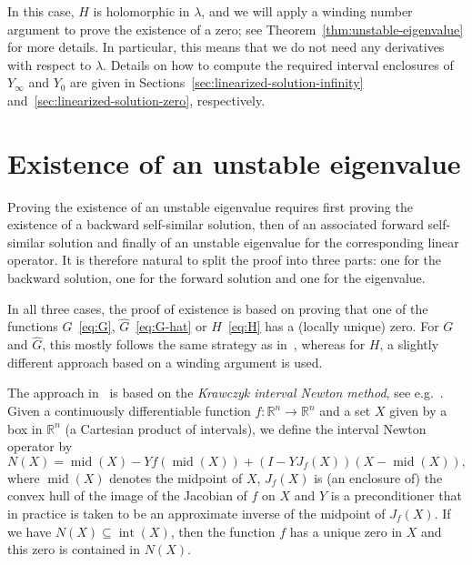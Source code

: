 \documentclass[11pt]{article}
\begin{document}
In this case, \(H\) is holomorphic in \(\lambda\), and we will
apply a winding number argument to prove the existence of a zero; see
Theorem~\ref{thm:unstable-eigenvalue} for more details. In particular,
this means that we do not need any derivatives with respect to
\(\lambda\). Details on how to compute the required interval
enclosures of \(Y_{\infty}\) and \(Y_{0}\) are given in
Sections~\ref{sec:linearized-solution-infinity}
and~\ref{sec:linearized-solution-zero}, respectively.

\section{Existence of an unstable eigenvalue}
\label{sec:existence-unstable-eigenvalue}

Proving the existence of an unstable eigenvalue requires first proving
the existence of a backward self-similar solution, then of an
associated forward self-similar solution and finally of an unstable
eigenvalue for the corresponding linear operator. It is therefore
natural to split the proof into three parts: one for the backward
solution, one for the forward solution and one for the eigenvalue.

In all three cases, the proof of existence is based on proving that
one of the functions \(G\)~\eqref{eq:G}, \(\hat{G}\)~\eqref{eq:G-hat}
or \(H\)~\eqref{eq:H} has a (locally unique) zero. For \(G\) and
\(\hat{G}\), this mostly follows the same strategy as
in~\cite[Section~5.1]{Dahne2024}, whereas for \(H\), a slightly
different approach based on a winding argument is used.

The approach in~\cite{Dahne2024} is based on the \emph{Krawczyk
  interval Newton method}, see e.g.~\cite{Moore1977}. Given a
continuously differentiable function
\(f\colon\mathbb{R}^{n} \to \mathbb{R}^{n}\) and a set \(X\) given by
a box in \(\mathbb{R}^{n}\) (a Cartesian product of intervals), we
define the interval Newton operator by
\begin{equation*}
  N(X) = \operatorname{mid}(X) - Yf(\operatorname{mid}(X)) + (I - YJ_{f}(X))(X - \operatorname{mid}(X)),
\end{equation*}
where \(\operatorname{mid}(X)\) denotes the midpoint of \(X\),
\(J_{f}(X)\) is (an enclosure of) the convex hull of the image of the
Jacobian of \(f\) on \(X\) and \(Y\) is a preconditioner that in
practice is taken to be an approximate inverse of the midpoint of
\(J_{f}(X)\). If we have \(N(X) \subseteq \operatorname{int}(X)\),
then the function \(f\) has a unique zero in \(X\) and this zero is
contained in \(N(X)\).
\end{document}
